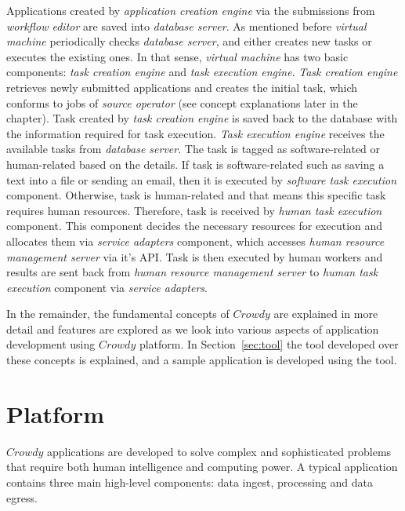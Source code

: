 Applications created by \textit{application creation engine} via the submissions from 
\textit{workflow editor} are saved into \textit{database server}. As mentioned before 
\textit{virtual machine} periodically checks \textit{database server}, and either 
creates new tasks or executes the existing ones. In that sense, \textit{virtual machine} 
has two basic components: \textit{task creation engine} and 
\textit{task execution engine}. \textit{Task creation engine} retrieves newly submitted 
applications and creates the initial task, which conforms to jobs of 
\textit{source operator} (see concept explanations later in the chapter). Task created 
by \textit{task creation engine} is saved back to the database with the information 
required for task execution. \textit{Task execution engine} receives the available 
tasks from \textit{database server}. The task is tagged as software-related or 
human-related based on the details. If task is software-related such as saving 
a text into a file or sending an email, then it is executed by 
\textit{software task execution} component. Otherwise, task is human-related and 
that means this specific task requires human resources. Therefore, task 
is received by \textit{human task execution} component. This component decides 
the necessary resources for execution and allocates them via \textit{service adapters} 
component, which accesses \textit{human resource management server} via it's API. 
Task is then executed by human workers and results are sent back from 
\textit{human resource management server} to \textit{human task execution} 
component via \textit{service adapters}.

In the remainder, the fundamental concepts of $Crowdy$ are explained 
in more detail and features are explored as we look into various aspects of application 
development using $Crowdy$ platform. In Section~\ref{sec:tool} the tool developed over 
these concepts is explained, and a sample application is developed using the tool.




\chapter{Platform}
\label{chap:platform}
$Crowdy$ applications are developed to solve complex and sophisticated problems 
that require both human intelligence and computing power. A typical application contains 
three main high-level components: data ingest, processing and data egress.

